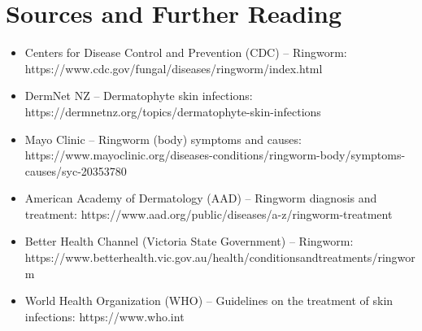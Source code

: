 \section*{Sources and Further Reading}
\begin{itemize}
    \item Centers for Disease Control and Prevention (CDC) -- Ringworm: https://www.cdc.gov/fungal/diseases/ringworm/index.html
    \item DermNet NZ -- Dermatophyte skin infections: https://dermnetnz.org/topics/dermatophyte-skin-infections
    \item Mayo Clinic -- Ringworm (body) symptoms and causes: https://www.mayoclinic.org/diseases-conditions/ringworm-body/symptoms-causes/syc-20353780
    \item American Academy of Dermatology (AAD) -- Ringworm diagnosis and treatment: https://www.aad.org/public/diseases/a-z/ringworm-treatment
    \item Better Health Channel (Victoria State Government) -- Ringworm: https://www.betterhealth.vic.gov.au/health/conditionsandtreatments/ringworm
    \item World Health Organization (WHO) -- Guidelines on the treatment of skin infections: https://www.who.int
\end{itemize}
